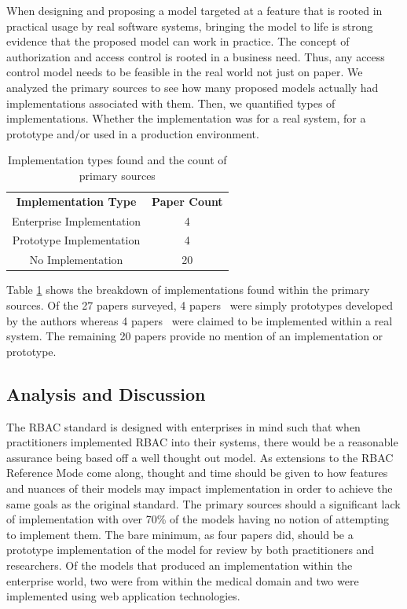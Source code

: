 When designing and proposing a model targeted at a feature that is rooted in practical
usage by real software systems, bringing the model to life is strong evidence that the
proposed model can work in practice. The concept of authorization and access control
is rooted in a business need. Thus, any access control model needs to be feasible
in the real world not just on paper. We analyzed the primary sources to see how many
proposed models actually had implementations associated with them.  Then, we quantified
types of implementations. Whether the implementation was for a real system, for a prototype
and/or used in a production environment.

\begin{table}
\centering
\caption{Implementation types found and the count of primary sources}
\begin{tabular}{ | c | c | }
\cline{1-2}

\textbf{Implementation Type} & \textbf{Paper Count} \\ \cline{1-2}
Enterprise Implementation & 4 \\ \cline{1-2}
Prototype Implementation & 4 \\ \cline{1-2}
No Implementation & 20 \\

\cline{1-2}
\end{tabular}
\label{tab:implementations}
\end{table}

Table \ref{tab:implementations} shows the breakdown of implementations found within the primary sources.
Of the 27 papers surveyed, 4 papers~\cite{zhou2007team,bao08:role, cholewka00:acontext-sensitive,huang06:pervasive} were simply prototypes developed by the authors whereas 4 papers~\cite{jian2008extended, aich09:role, yao2008task, motta03:contextual} were claimed to be implemented within a real
system. The remaining 20 papers provide no
mention of an implementation or prototype.  


\subsection{Analysis and Discussion}

The RBAC standard is designed with enterprises in mind such that when practitioners implemented RBAC into their systems,
there would be a reasonable assurance being based off a well thought out model.  As extensions to the RBAC Reference Mode
come along, thought and time should be given to how features and nuances of their models may impact implementation
in order to achieve the same goals as the original standard.  The primary sources should a significant lack of implementation
with over 70\% of the models having no notion of attempting to implement them.  The bare minimum, as four papers did, should be
a prototype implementation of the model for review by both practitioners and researchers. Of the models that produced an 
implementation within the enterprise world, two were from within the medical domain and two were implemented using web application technologies.  


